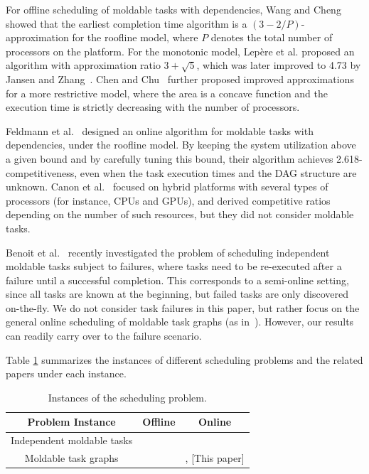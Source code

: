 \documentclass{article}
\begin{document}
For offline scheduling of moldable tasks with dependencies,
Wang and Cheng~\cite{Wang92_DAG} showed that the earliest completion time algorithm is a $(3-2/P)$-approximation for the roofline model, where $P$ denotes the total number of processors on the platform.
For the monotonic model, Lep\`{e}re et al. \cite{Lepere01_DAG} proposed an algorithm with approximation ratio $3+\sqrt{5}$, which was later improved to 4.73 by Jansen and Zhang~\cite{Jansen06_DAG}.
Chen and Chu~\cite{Chen13_concave} further proposed improved approximations for a more restrictive model, where the area is a concave function and the execution time is strictly decreasing with the number of processors.

Feldmann et al.~\cite{Feldmann98_DAG} designed an online algorithm for
moldable tasks
with dependencies, under the roofline model.
By keeping the system utilization
above a given bound and by carefully tuning this bound, their algorithm
achieves 2.618-competitiveness, even when the task execution times and the DAG structure are unknown.
Canon et al.~\cite{Canon20_online} focused on hybrid platforms with several types of processors
(for instance, CPUs and GPUs), and derived competitive ratios depending on the number
of such resources, but they did not consider moldable tasks.

Benoit et al.~\cite{Benoit20_cluster, Benoit21_ieeetc} recently investigated the problem of scheduling independent moldable tasks subject to failures,
where tasks need to be re-executed after a failure until a successful completion.
This corresponds to a semi-online setting, since all tasks are known at the beginning, but
failed tasks are only discovered on-the-fly.
We do not consider task failures in this paper, but rather focus on the general
online scheduling of moldable task graphs (as in~\cite{Feldmann98_DAG}). However, our results can readily carry over to the failure scenario.

Table \ref{tab.references} summarizes the instances of different scheduling problems and the related papers under each instance.

\begin{table}[t]
\centering
\caption{Instances of the scheduling problem.}
\label{tab.references}
\begin{tabular}{|c|c|c|}
\hline
Problem Instance & Offline & Online\\ \hline
Independent moldable tasks & \cite{Turek92,Jansen12_3over2,Jansen18_PTAS}& \cite{Ye18_online, Havill08_SET, Dutton07_ECT, Kell15_Improved}\\ \hline
Moldable task graphs & \cite{Wang92_DAG,Chen13_concave, Lepere01_DAG, Jansen06_DAG} & \cite{Feldmann98_DAG}, [This paper] \\ \hline
\end{tabular}
\end{table}
\end{document}
